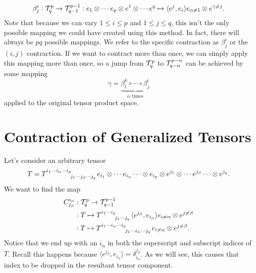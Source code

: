 \[ \beta^i_j : \mathcal{T}^p_q \to \mathcal{T}^{p-1}_{q-1} : e_1 \otimes \cdots e_p \otimes e^1 \otimes \cdots e^q \mapsto \langle e^j, e_i \rangle e_{\alpha \not=1}\otimes e^{\gamma \not= j}. \]
Note that because we can vary $1 \leq i \leq p$ and $1 \leq j \leq q$, this isn't the only possible mapping we could have created using this method.
In fact, there will always be $pq$ possible mappings.
We refer to the specific contraction as $\beta^i_j$ or the $(i,j)$ contraction.
If we want to contract more than once, we can simply apply this mapping more than once, so a jump from $\mathcal{T}^p_q$ to $\mathcal{T}^{p-\alpha}_{q-\alpha}$ can be achieved by some mapping
\[ \gamma = \underbrace{\beta^{k}_{l} \circ \cdots \circ \beta^i_j}_{\text{$\alpha$ times}} \]
applied to the original tensor product space.

\section{Contraction of Generalized Tensors}
Let's consider an arbitrary tensor 
\[
T = \tensor{T}{^{i_1\cdots i_\alpha \cdots i_p}_{j_1 \cdots j_\beta \cdots j_q}} e_{i_1} \otimes \cdots e_{i_\alpha} \cdots \otimes e_{i_p} \otimes e^{j_1} \otimes \cdots e^{j_\beta} \cdots \otimes e^{j_q}.
\]
We want to find the map 
\begin{align*}
C^{i_\alpha}_{j_\beta} &: \tps{T}^p_q \to \tps{T}^{p-1}_{q-1} \\ 
                       &: T \mapsto \tensor{T}{^{i_1 \cdots i_p}_{j_1 \cdots j_q}} \langle e^{j_\beta}, e_{i_\alpha} \rangle e_{i \not= \alpha } \otimes e^{j \not= \beta} \\
                       &: T \mapsto \tensor{T}{^{i_1\cdots i_\alpha \cdots i_p}_{j_1\cdots i_\alpha \cdots j_q}} e_{i \not= \alpha } \otimes e^{j \not= \beta}.
\end{align*}
Notice that we end up with an $i_\alpha$ in both the superscript and subscript indices of $T$.
Recall this happens because $\langle e^{j_\beta}, e_{i_\alpha} \rangle = \delta^{j_\beta}_{i_\alpha}$.
As we will see, this causes that index to be dropped in the resultant tensor component.

